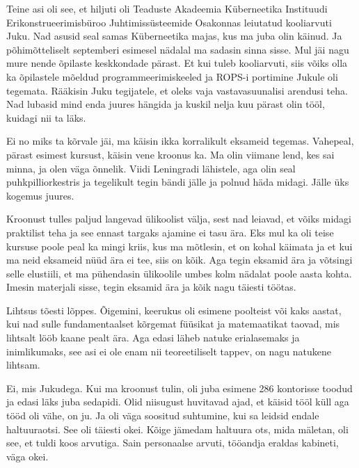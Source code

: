 Teine asi oli see, et  hiljuti oli Teaduste Akadeemia Küberneetika Instituudi Erikonstrueerimisbüroo Juhtimissüsteemide Osakonnas leiutatud kooliarvuti Juku. Nad asusid seal samas Küberneetika majas, kus ma juba olin käinud. Ja põhimõtteliselt septemberi esimesel nädalal ma sadasin sinna sisse. Mul jäi nagu mure nende õpilaste keskkondade pärast. Et kui tuleb kooliarvuti, siis võiks olla ka  õpilastele mõeldud programmeerimiskeeled ja ROPS-i portimine Jukule oli tegemata. Rääkisin Juku tegijatele, et oleks vaja  vastavasuunalisi arendusi teha. Nad lubasid mind enda juures hängida ja kuskil nelja kuu pärast olin tööl, kuidagi nii ta läks. 


Ei no miks ta kõrvale jäi, ma käisin ikka korralikult eksameid tegemas. Vahepeal, pärast esimest kursust, käisin vene kroonus ka.  Ma olin viimane lend, kes sai minna, ja olen väga õnnelik. Viidi Leningradi lähistele, aga olin seal puhkpilliorkestris ja tegelikult tegin bändi jälle ja polnud häda midagi. Jälle üks kogemus juures. 

Kroonust tulles paljud langevad ülikoolist välja, sest nad leiavad, et võiks midagi praktilist teha ja see ennast targaks ajamine ei tasu ära. Eks mul ka oli teise kursuse poole peal ka mingi kriis, kus ma mõtlesin, et on kohal käimata ja et kui ma neid eksameid nüüd ära ei tee, siis on kõik. Aga tegin eksamid ära ja  võtsingi selle elustiili, et ma pühendasin ülikoolile umbes kolm nädalat poole aasta kohta. Imesin materjali sisse, tegin eksamid ära ja kõik nagu täiesti töötas. 


Lihtsus tõesti lõppes. Õigemini, keerukus oli esimene poolteist või kaks  aastat,  kui nad sulle fundamentaalset kõrgemat füüsikat ja matemaatikat taovad, mis lihtsalt lööb kaane pealt ära. Aga edasi läheb natuke erialasemaks ja inimlikumaks, see asi ei ole enam nii teoreetiliselt tappev, on nagu natukene lihtsam. 


Ei, mis Jukudega. Kui ma kroonust tulin, oli juba esimene  286  kontorisse toodud ja edasi läks juba sedapidi. Olid niisugust huvitavad ajad, et käisid  tööl küll aga tööd oli  vähe, on ju.  Ja oli väga soositud suhtumine, kui sa leidsid endale haltuuraotsi. See oli täiesti okei. Kõige jämedam haltuura ots, mida mäletan, oli see, et tuldi koos arvutiga. Sain personaalse arvuti, tööandja eraldas kabineti, väga okei. 

